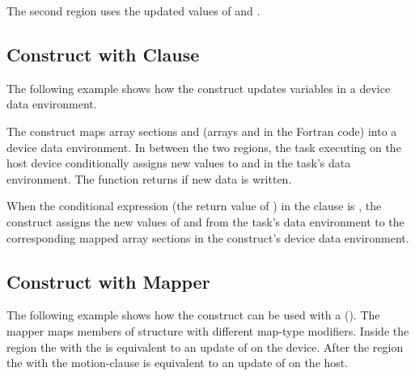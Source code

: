 The second  region uses the updated values of  and .



\subsection{ Construct with  Clause}
\label{subsec:target_update_if}

The following example shows how the  construct updates 
variables in a device data environment.

The  construct maps array sections  and  
(arrays  and  in the Fortran code) into a device data environment. In between 
the two  regions, the task executing on the host device conditionally 
assigns new values to  and  in the task's data environment. The function  
returns  if new data is written.

When the conditional expression (the return value of ) in the 
 clause is , the  construct 
assigns the new values of  and  from the task's data environment to the corresponding 
mapped array sections in the  construct's device data 
environment.



\subsection{ Construct with Mapper}
\label{subsec:target_update_mapper}

The following example shows how the  construct can be used with a  (). 
The  mapper maps members of structure  with different map-type modifiers. Inside the 
 region the  with the   is equivalent to an update of  on the device. After the  region the  with the  motion-clause is equivalent to an update of  on the host.



